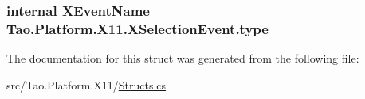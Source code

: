 \label{struct_tao_1_1_platform_1_1_x11_1_1_x_selection_event_a50fc5d43a7395cacd644014412cead4d}
\hypertarget{struct_tao_1_1_platform_1_1_x11_1_1_x_selection_event_a17fd40318880e1c501342b8fdca2b3af}{
\subsubsection[{type}]{\setlength{\rightskip}{0pt plus 5cm}internal {\bf XEventName} {\bf Tao.Platform.X11.XSelectionEvent.type}}}
\label{struct_tao_1_1_platform_1_1_x11_1_1_x_selection_event_a17fd40318880e1c501342b8fdca2b3af}


The documentation for this struct was generated from the following file:\begin{DoxyCompactItemize}
\item 
src/Tao.Platform.X11/\hyperlink{_structs_8cs}{Structs.cs}\end{DoxyCompactItemize}
